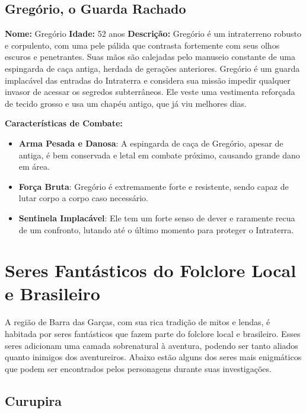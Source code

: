 \begin{personagem}

\subsection{Gregório, o Guarda Rachado}

\textbf{Nome:} Gregório  
\textbf{Idade:} 52 anos  
\textbf{Descrição:}  
Gregório é um intraterreno robusto e corpulento, com uma pele pálida que contrasta fortemente com seus olhos escuros e penetrantes. Suas mãos são calejadas pelo manuseio constante de uma espingarda de caça antiga, herdada de gerações anteriores. Gregório é um guarda implacável das entradas do Intraterra e considera sua missão impedir qualquer invasor de acessar os segredos subterrâneos. Ele veste uma vestimenta reforçada de tecido grosso e usa um chapéu antigo, que já viu melhores dias.

\textbf{Características de Combate:}
\begin{itemize}
    \item \textbf{Arma Pesada e Danosa}: A espingarda de caça de Gregório, apesar de antiga, é bem conservada e letal em combate próximo, causando grande dano em área.
    \item \textbf{Força Bruta}: Gregório é extremamente forte e resistente, sendo capaz de lutar corpo a corpo caso necessário.
    \item \textbf{Sentinela Implacável}: Ele tem um forte senso de dever e raramente recua de um confronto, lutando até o último momento para proteger o Intraterra.
\end{itemize}
\end{personagem}
\section{Seres Fantásticos do Folclore Local e Brasileiro}

A região de Barra das Garças, com sua rica tradição de mitos e lendas, é habitada por seres fantásticos que fazem parte do folclore local e brasileiro. Esses seres adicionam uma camada sobrenatural à aventura, podendo ser tanto aliados quanto inimigos dos aventureiros. Abaixo estão alguns dos seres mais enigmáticos que podem ser encontrados pelos personagens durante suas investigações.

\subsection{Curupira}

